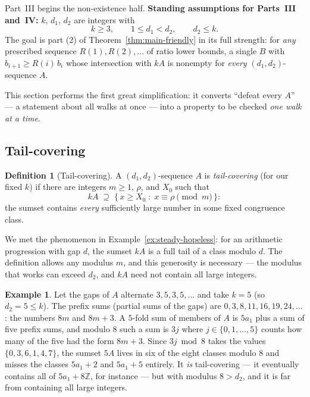 \documentclass[11pt,reqno]{amsart}
\theoremstyle{plain}
\theoremstyle{definition}
\newtheorem{definition}[theorem]{Definition}
\newtheorem{example}[theorem]{Example}
\theoremstyle{remark}
\newcommand{\ZZ}{\mathbb{Z}}
\begin{document}
Part~III begins the non-existence half. \textbf{Standing assumptions for
Parts~III and~IV:} $k$, $d_1$, $d_2$ are integers with
\[
  k \ge 3, \qquad 1 \le d_1 < d_2, \qquad d_2 \le k .
\]
The goal is part (2) of Theorem~\ref{thm:main-friendly} in its full strength: for
\emph{any} prescribed sequence $R(1), R(2), \dots$ of ratio lower bounds, a single
$B$ with $b_{i+1} \ge R(i)\,b_i$ whose intersection with $kA$ is nonempty for
\emph{every} $(d_1,d_2)$-sequence $A$.

This section performs the first great simplification: it converts ``defeat every
$A$'' --- a statement about all walks at once --- into a property to be checked
\emph{one walk at a time}.

\subsection{Tail-covering}

\begin{definition}[Tail-covering]\label{def:tail-covering}
A $(d_1,d_2)$-sequence $A$ is \emph{tail-covering} (for our fixed $k$) if there are
integers $m \ge 1$, $\rho$, and $X_0$ such that
\[
  kA \;\supseteq\; \{\, x \ge X_0 \;:\; x \equiv \rho \pmod m \,\} :
\]
the sumset contains \emph{every} sufficiently large number in some fixed congruence
class.
\end{definition}

We met the phenomenon in Example~\ref{ex:steady-hopeless}: for an arithmetic
progression with gap $d$, the sumset $kA$ is a full tail of a class modulo $d$. The
definition allows any modulus $m$, and this generosity is necessary --- the modulus
that works can exceed $d_2$, and $kA$ need not contain all large integers.

\begin{example}\label{ex:35gaps}
Let the gaps of $A$ alternate $3, 5, 3, 5, \dots$ and take $k = 5$ (so $d_2 = 5 \le
k$). The prefix sums (partial sums of the gaps) are
$0, 3, 8, 11, 16, 19, 24, \dots$: the numbers $8m$ and $8m + 3$. A $5$-fold sum of
members of $A$ is $5a_1$ plus a sum of five prefix sums, and modulo $8$ such a sum is
$3j$ where $j \in \{0, 1, \dots, 5\}$ counts how many of the five had the form
$8m{+}3$. Since $3j \bmod 8$ takes the values $\{0, 3, 6, 1, 4, 7\}$, the sumset
$5A$ lives in six of the eight classes modulo $8$ and misses the classes
$5a_1 + 2$ and $5a_1 + 5$ entirely. It \emph{is} tail-covering --- it eventually
contains all of $5a_1 + 8\ZZ$, for instance --- but with modulus $8 > d_2$, and it is
far from containing all large integers.
\end{example}
\end{document}
